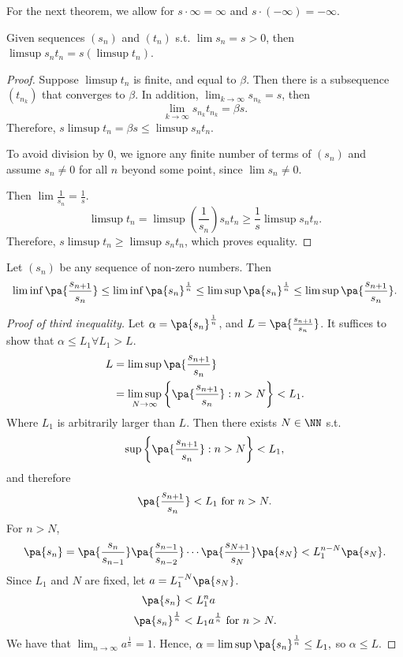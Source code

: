 \documentclass[11pt]{scrartcl}
\numberwithin{equation}{section}
\begin{document}
For the next theorem, we allow for $s\cdot\infty = \infty$
and $s \cdot (-\infty) = -\infty$.

\begin{theorem}
    Given sequences $(s_n)$ and $(t_n)$ s.t. 
    $\lim{s_n}=s>0$,
    then 
    $\limsup{s_nt_n} = s (\limsup t_n)$. 
\end{theorem}

\begin{proof}
    Suppose $\limsup t_n$ is finite, and equal to $\beta$.
    Then there is a subsequence $(t_{n_k})$ that converges to $\beta$.
    In addition, $\lim_{k\rightarrow \infty}{s_{n_k}} = s$,
    then \[ \lim_{k\rightarrow \infty}{s_{n_k}t_{n_k}} = \beta s.\]
    Therefore, $s\limsup t_n = \beta s\leq \limsup s_nt_n$.
    
    To avoid division by $0$, we ignore any finite number of terms of $(s_n)$ and 
    assume $s_n\neq 0$ for all $n$ beyond some point, since 
    $\lim s_n \neq 0$.

    Then $\lim \frac{1}{s_n} = \frac{1}{s}$. 
    \[ \limsup t_n = \limsup \left(\frac{1}{s_n}\right)s_nt_n \geq \frac{1}{s}\limsup s_nt_n. \]
    Therefore, $s\limsup t_n \geq \limsup s_nt_n$, which proves equality.
\end{proof}
\begin{theorem}
    Let $(s_n)$ be any sequence of non-zero numbers. 
    Then 
    \[ \liminf \pa{\frac{s_{n+1}}{s_n}} \leq \liminf \pa{s_n}^{\frac{1}{n}}
    \leq \limsup \pa{s_n}^{\frac{1}{n}}\leq \limsup \pa{\frac{s_{n+1}}{s_n}}.\]
\end{theorem}
\begin{proof}
    [Proof of third inequality]
    Let $\alpha = \pa{s_n}^{\frac{1}{n}}$, and 
    $L = \pa{\frac{s_{n+1}}{s_n}}$.
    It suffices to show that $\alpha \leq L_1 \forall L_1>L.$
    \begin{align*}
        L &= \limsup \pa{\frac{s_{n+1}}{s_n}} \\
        &= \limsup_{N\rightarrow \infty}\left\{\pa{\frac{s_{n+1}}{s_n}} : n > N\right\} < L_1.
    \end{align*}
    Where $L_1$ is arbitrarily larger than $L$. 
    Then there exists $N\in\NN$ s.t. 
    \[ \sup \left\{\pa{\frac{s_{n+1}}{s_n}} : n > N\right\} < L_1,\]
    and therefore 
    \[ \pa{\frac{s_{n+1}}{s_n}} < L_1 \text{ for } n>N.\]
    For $n>N$, 
    \[ \pa{s_n} = \pa{\frac{s_{n}}{s_{n-1}}}\pa{\frac{s_{n-1}}{s_{n-2}}}
    \cdots \pa{\frac{s_{N+1}}{s_N}}\pa{s_N} < L_1^{n-N}\pa{s_N}.\]
    Since $L_1$ and $N$ are fixed, let $a = L_1^{-N}\pa{s_N}$.
    \begin{align*}
        \pa{s_n} &< L_1^na \\
        \pa{s_n}^{\frac{1}{n}} &< L_1a^{\frac{1}{n}} \text{ for } n > N.
    \end{align*}
    We have that $\lim_{n\rightarrow \infty}{a^{\frac{1}{n}}} =1$.
    Hence, $\alpha= \limsup \pa{s_n}^{\frac{1}{n}}\leq L_1,$
    so $\alpha \leq L$.
\end{proof}
\end{document}
